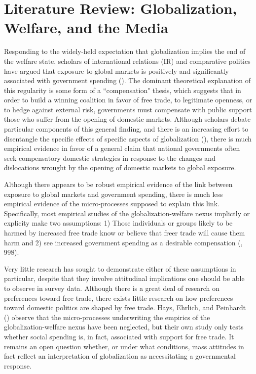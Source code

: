 \documentclass[12pt]{report}
\begin{document}
\section{Literature Review: Globalization, Welfare, and the Media}

Responding to the widely-held expectation that globalization implies the end of the welfare
state, scholars of international relations (IR) and comparative politics have argued that
exposure to global markets is positively and significantly associated with government spending
(\citealt{Cameron:1978vb, Ruggie:1982wx, Katzenstein:1985ub, Baek:2009vq, Rodrik:1998te, Garrett:1995tj, Garrett:1998wl, Adsera:2002vt}). The dominant theoretical explanation of this regularity is some form of a
``compensation" thesis, which suggests that in order to build a winning coalition in favor of
free trade, to legitimate openness, or to hedge against external risk, governments must
compensate with public support those who suffer from the opening of domestic markets. Although
scholars debate particular components of this general finding, and there is an increasing effort
to disentangle the specific effects of specific aspects of globalization (\citealt{Burgoon:2001dp}), there
is much empirical evidence in favor of a general claim that national governments often seek
compensatory domestic strategies in response to the changes and dislocations wrought by the
opening of domestic markets to global exposure.
	
Although there appears to be robust empirical evidence of the link between exposure to global
markets and government spending, there is much less empirical evidence of the micro-processes
supposed to explain this link. Specifically, most empirical studies of the globalization-welfare
nexus implictly or explicity make two assumptions: 1) Those individuals or groups likely to be
harmed by increased free trade know or believe that freer trade will cause them harm and 2) see
increased government spending as a desirable compensation (\citealt{Rodrik:1998te}, 998).

Very little research has sought to demonstrate either of these assumptions in particular,
despite that they involve attitudinal implications one should be able to observe in survey data.
Although there is a great deal of research on preferences toward free trade, there exists little
research on how preferences toward domestic politics are shaped by free trade. Hays, Ehrlich,
and Peinhardt (\citeyear{Hays:2005vo}) observe that the micro-processes underwriting the empirics of the
globalization-welfare nexus have been neglected, but their own study only tests whether social
spending is, in fact, associated with support for free trade. It remains an open question
whether, or under what conditions, mass attitudes in fact reflect an interpretation of
globalization as necessitating a governmental response.
\end{document}
